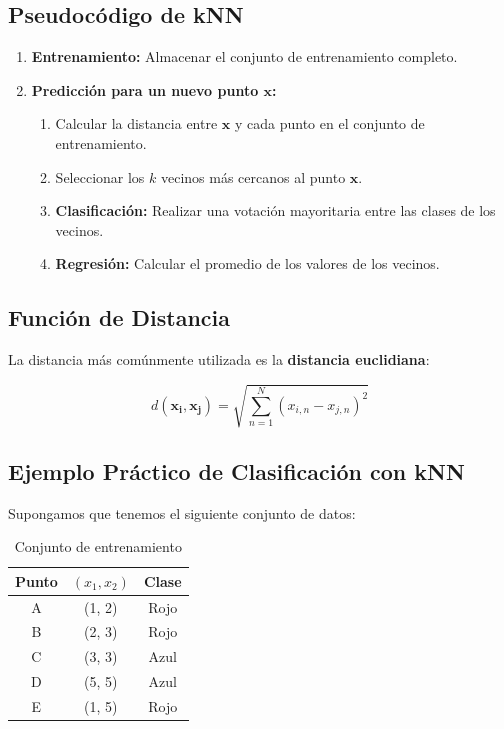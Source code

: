\documentclass[a4paper, 11pt]{article}
\begin{document}
\subsection{Pseudocódigo de kNN}
\begin{enumerate}
    \item \textbf{Entrenamiento:} Almacenar el conjunto de entrenamiento completo.
    \item \textbf{Predicción para un nuevo punto $\mathbf{x}$:}
    \begin{enumerate}
        \item Calcular la distancia entre $\mathbf{x}$ y cada punto en el conjunto de entrenamiento.
        \item Seleccionar los $k$ vecinos más cercanos al punto $\mathbf{x}$.
        \item \textbf{Clasificación:} Realizar una votación mayoritaria entre las clases de los vecinos.
        \item \textbf{Regresión:} Calcular el promedio de los valores de los vecinos.
    \end{enumerate}
\end{enumerate}

\subsection{Función de Distancia}
La distancia más comúnmente utilizada es la \textbf{distancia euclidiana}:

\[
d(\mathbf{x_i}, \mathbf{x_j}) = \sqrt{\sum_{n=1}^{N} (x_{i,n} - x_{j,n})^2}
\]

\subsection{Ejemplo Práctico de Clasificación con kNN}

Supongamos que tenemos el siguiente conjunto de datos:

\begin{table}[h!]
\centering
\begin{tabular}{ccc}
\toprule
\textbf{Punto} & $(x_1, x_2)$ & \textbf{Clase} \\
\midrule
A & (1, 2) & Rojo \\
B & (2, 3) & Rojo \\
C & (3, 3) & Azul \\
D & (5, 5) & Azul \\
E & (1, 5) & Rojo \\
\bottomrule
\end{tabular}
\caption{Conjunto de entrenamiento}
\end{table}
\end{document}
